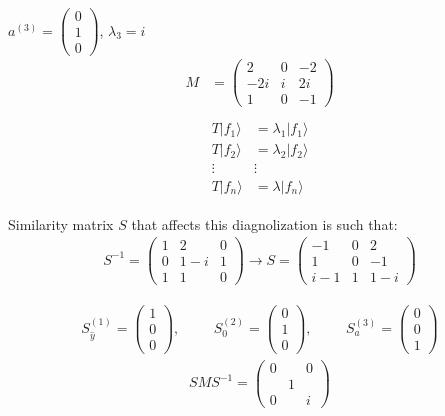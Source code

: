 \documentclass{article}
\begin{document}
$a^(3)=\begin{pmatrix}
0\\
1\\
0
\end{pmatrix}$, \hspace{1cm} $\lambda_{3}=i$
\vspace{1cm}
\begin{align*}
M&=\begin{pmatrix}
2&0&-2\\
-2i&i&2i\\
1&0&-1
\end{pmatrix}\\
\end{align*}
\begin{align*}
\begin{matrix}
T|f_{1}\rangle&=\lambda_{1}|f_{1}\rangle\\
T|f_{2}\rangle &= \lambda_{2}|f_{2}\rangle\\
\vdots & \vdots\\
T|f_{n}\rangle &=\lambda |f_{n}\rangle
\end{matrix}
\end{align*}

Similarity matrix $S$ that affects this diagnolization is such that:\\

\begin{align*}S^{-1}=\begin{pmatrix}
1&2&0\\
0&1-i&1\\
1&1&0
\end{pmatrix} \rightarrow S=\begin{pmatrix}
-1&0&2\\
1&0&-1\\
i-1&1&1-i
\end{pmatrix}
\end{align*}

\begin{align*}
S_{\hat{y}}^(1)=\begin{pmatrix}
1\\
0\\
0
\end{pmatrix}, \hspace{1cm} S_{0}^(2)=\begin{pmatrix}
0\\
1\\
0
\end{pmatrix}, \hspace{1cm}
S_{a}^(3)=\begin{pmatrix}
0\\
0\\
1
\end{pmatrix}
\end{align*}
\newpage
\begin{align*}
SMS^{-1}=\begin{pmatrix}
0&&0\\
&1&\\
0&&i
\end{pmatrix}
\end{align*}
\end{document}
